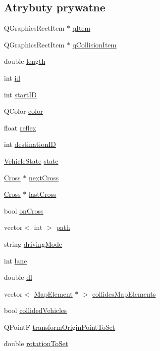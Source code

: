 \subsection*{Atrybuty prywatne}
\begin{DoxyCompactItemize}
\item 
Q\-Graphics\-Rect\-Item $\ast$ \hyperlink{class_vehicle_a6de375e22bd723ba487c50489e569548}{q\-Item}
\item 
Q\-Graphics\-Rect\-Item $\ast$ \hyperlink{class_vehicle_a9bf00c3b511e214ab95d5da12e49633c}{q\-Collision\-Item}
\item 
double \hyperlink{class_vehicle_a675a8ef19fd15e2753bd963c19a4904c}{length}
\item 
int \hyperlink{class_vehicle_a7421a7a2d98b4ec6dfabd1041261aa03}{id}
\item 
int \hyperlink{class_vehicle_a4b941cb02036dc75ae4ad733e3493119}{start\-I\-D}
\item 
Q\-Color \hyperlink{class_vehicle_a290ebfd05412ee45125dbc282f724488}{color}
\item 
float \hyperlink{class_vehicle_a2742f50ec74d5b8ac0f81d3222842110}{reflex}
\item 
int \hyperlink{class_vehicle_a75d0148cd658133b6d6a550c27bfb936}{destination\-I\-D}
\item 
\hyperlink{_vehicle_state_8h_a75c52206c3c79acb62c0fddc66df3676}{Vehicle\-State} \hyperlink{class_vehicle_ab3541bd459598db80bb2748db1452feb}{state}
\item 
\hyperlink{class_cross}{Cross} $\ast$ \hyperlink{class_vehicle_a32fb5373b1808c23c25124ea2ce66b8c}{next\-Cross}
\item 
\hyperlink{class_cross}{Cross} $\ast$ \hyperlink{class_vehicle_af0dd745daa5f73c8e4b2f687effca686}{last\-Cross}
\item 
bool \hyperlink{class_vehicle_a7a5fe72aaf4d2f119a4dc58c4b35e36e}{on\-Cross}
\item 
vector$<$ int $>$ \hyperlink{class_vehicle_a8379932487731fc05e7c88bd0609c802}{path}
\item 
string \hyperlink{class_vehicle_a0aaf8072804d5034c24dc35772551b20}{driving\-Mode}
\item 
int \hyperlink{class_vehicle_a838acb6c559579924c5738e921886214}{lane}
\item 
double \hyperlink{class_vehicle_a4a1cd6d5bc788fa5e99ed463e6d104de}{dl}
\item 
vector$<$ \hyperlink{class_map_element}{Map\-Element} $\ast$ $>$ \hyperlink{class_vehicle_ade840ce20f05a39006a8a44a26ac42bf}{collides\-Map\-Elements}
\item 
bool \hyperlink{class_vehicle_a28f41cf00d7689c39e29bc951e3e0472}{collided\-Vehicles}
\item 
Q\-Point\-F \hyperlink{class_vehicle_ad04fb4832c299dd0508e3b335fa5ce20}{transform\-Origin\-Point\-To\-Set}
\item 
double \hyperlink{class_vehicle_a15bac66c5ee90f81529c9eb5ba2d7b3c}{rotation\-To\-Set}
\end{DoxyCompactItemize}
